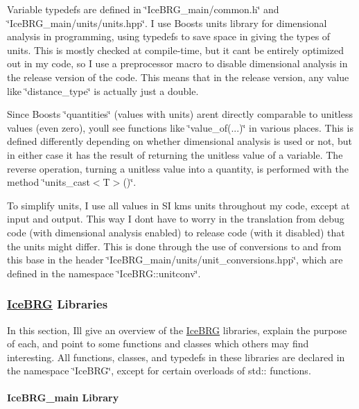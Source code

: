 Variable typedefs are defined in \char`\"{}\+Ice\+B\+R\+G\+\_\+main/common.\+h\char`\"{} and \char`\"{}\+Ice\+B\+R\+G\+\_\+main/units/units.\+hpp\char`\"{}. I use Boost\textquotesingle{}s units library for dimensional analysis in programming, using typedefs to save space in giving the types of units. This is mostly checked at compile-\/time, but it can\textquotesingle{}t be entirely optimized out in my code, so I use a preprocessor macro to disable dimensional analysis in the release version of the code. This means that in the release version, any value like \char`\"{}distance\+\_\+type\char`\"{} is actually just a double.

Since Boost\textquotesingle{}s \char`\"{}quantities\char`\"{} (values with units) aren\textquotesingle{}t directly comparable to unitless values (even zero), you\textquotesingle{}ll see functions like \char`\"{}value\+\_\+of(...)\char`\"{} in various places. This is defined differently depending on whether dimensional analysis is used or not, but in either case it has the result of returning the unitless value of a variable. The reverse operation, turning a unitless value into a quantity, is performed with the method \char`\"{}units\+\_\+cast$<$\+T$>$()\char`\"{}.

To simplify units, I use all values in S\+I kms units throughout my code, except at input and output. This way I don\textquotesingle{}t have to worry in the translation from debug code (with dimensional analysis enabled) to release code (with it disabled) that the units might differ. This is done through the use of conversions to and from this base in the header \char`\"{}\+Ice\+B\+R\+G\+\_\+main/units/unit\+\_\+conversions.\+hpp\char`\"{}, which are defined in the namespace \char`\"{}\+Ice\+B\+R\+G\+::unitconv\char`\"{}.

\subsubsection*{\hyperlink{namespaceIceBRG}{Ice\+B\+R\+G} Libraries}

In this section, I\textquotesingle{}ll give an overview of the \hyperlink{namespaceIceBRG}{Ice\+B\+R\+G} libraries, explain the purpose of each, and point to some functions and classes which others may find interesting. All functions, classes, and typedefs in these libraries are declared in the namespace \char`\"{}\+Ice\+B\+R\+G\char`\"{}, except for certain overloads of std\+:\+: functions.

\paragraph*{Ice\+B\+R\+G\+\_\+main Library}

